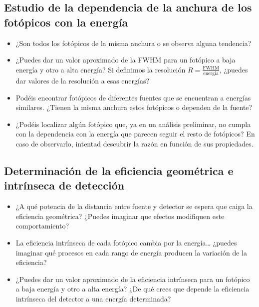 \documentclass[11pt]{article}
\begin{document}
\subsection{Estudio de la dependencia de la anchura de los fotópicos con la energía}
\begin{itemize}
    \item ¿Son todos los fotópicos de la misma anchura o se observa alguna tendencia?
    \item ¿Puedes dar un valor aproximado de la FWHM para un fotópico a baja energía y otro a alta energía? Si definimos la resolución \( R = \frac{\mathrm{FWHM}}{\mathrm{energia}} \), ¿puedes dar valores de la resolución a esas energías?
    \item Podéis encontrar fotópicos de diferentes fuentes que se encuentran a energías similares. ¿Tienen la misma anchura estos fotópicos o dependen de la fuente?
    \item ¿Podéis localizar algún fotópico que, ya en un análisis preliminar, no cumpla con la dependencia con la energía que parecen seguir el resto de fotópicos? En caso de observarlo, intentad descubrir la razón en función de sus propiedades.
\end{itemize}

\subsection{Determinación de la eficiencia geométrica e intrínseca de detección}
\begin{itemize}
    \item ¿A qué potencia de la distancia entre fuente y detector se espera que caiga la eficiencia geométrica? ¿Puedes imaginar que efectos modifiquen este comportamiento?
    \item La eficiencia intrínseca de cada fotópico cambia por la energía… ¿puedes imaginar qué procesos en cada rango de energía producen la variación de la eficiencia?
    \item ¿Puedes dar un valor aproximado de la eficiencia intrínseca para un fotópico a baja energía y otro a alta energía? ¿De qué crees que depende la eficiencia intrínseca del detector a una energía determinada?
\end{itemize}
\end{document}
